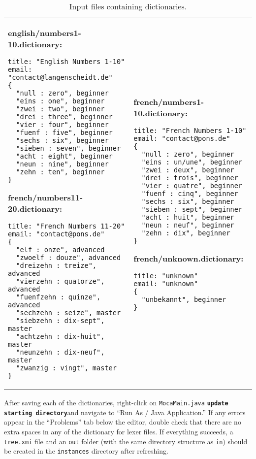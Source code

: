\begin{table}
\begin{tabular}{p{6cm} p{6cm} }
\footnotesize
\textbf{english/numbers1-10.dictionary:}
\begin{verbatim}
title: "English Numbers 1-10"
email: "contact@langenscheidt.de"	
{
  "null : zero", beginner
  "eins : one", beginner
  "zwei : two", beginner
  "drei : three", beginner
  "vier : four", beginner
  "fuenf : five", beginner
  "sechs : six", beginner
  "sieben : seven", beginner
  "acht : eight", beginner
  "neun : nine", beginner
  "zehn : ten", beginner 
}
\end{verbatim} 

\footnotesize
\textbf{french/numbers11-20.dictionary:}
\begin{verbatim}
title: "French Numbers 11-20"
email: "contact@pons.de"	
{
  "elf : onze", advanced
  "zwoelf : douze", advanced
  "dreizehn : treize", advanced
  "vierzehn : quatorze", advanced
  "fuenfzehn : quinze", advanced
  "sechzehn : seize", master
  "siebzehn : dix-sept", master
  "achtzehn : dix-huit", master
  "neunzehn : dix-neuf", master
  "zwanzig : vingt", master
}
\end{verbatim}
&

\footnotesize
\textbf{french/numbers1-10.dictionary:}
\begin{verbatim}   
title: "French Numbers 1-10"
email: "contact@pons.de"	
{
  "null : zero", beginner
  "eins : un/une", beginner
  "zwei : deux", beginner
  "drei : trois", beginner
  "vier : quatre", beginner
  "fuenf : cinq", beginner
  "sechs : six", beginner
  "sieben : sept", beginner
  "acht : huit", beginner
  "neun : neuf", beginner
  "zehn : dix", beginner 
}
\end{verbatim}

\footnotesize
\textbf{french/unknown.dictionary:}
\begin{verbatim}
title: "unknown"
email: "unknown"
{
  "unbekannt", beginner
}
\end{verbatim}
  \\
\end{tabular}   
\caption{Input files containing dictionaries.}
\label{moca-inputdata}

\end{table}   

After saving each of the dictionaries, right-click on \texttt{MocaMain.java} \texttt{\bf update starting directory}and navigate to ``Run As / Java
Application.'' If any errors appear in the ``Problems'' tab below the editor, double check that there are no extra spaces in any of the dictionary for lexer
files. If everything succeeds, a \texttt{tree.xmi} file and an \texttt{out} folder (with the same directory structure as \texttt{in}) should be created in the
\texttt{instances} directory after refreshing.

